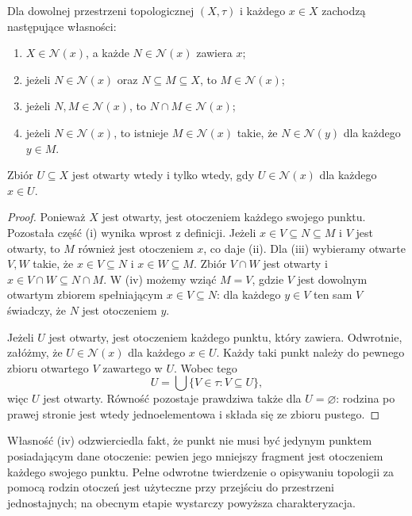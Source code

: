 \begin{stwierdzenie}
\label{prop:topog-otoczenia}
Dla dowolnej przestrzeni topologicznej $(X,\tau)$
i każdego $x\in X$ zachodzą następujące własności:
\begin{enumerate}[label=(\roman*)]
\item $X\in\mathcal N(x)$, a każde $N\in\mathcal N(x)$ zawiera $x$;
\item jeżeli $N\in\mathcal N(x)$ oraz $N\subseteq M\subseteq X$,
      to $M\in\mathcal N(x)$;
\item jeżeli $N,M\in\mathcal N(x)$, to
      $N\cap M\in\mathcal N(x)$;
\item jeżeli $N\in\mathcal N(x)$, to istnieje $M\in\mathcal N(x)$
      takie, że $N\in\mathcal N(y)$ dla każdego $y\in M$.
\end{enumerate}
Zbiór $U\subseteq X$ jest otwarty wtedy i tylko wtedy, gdy
$U\in\mathcal N(x)$ dla każdego $x\in U$.
\end{stwierdzenie}
\begin{proof}
Ponieważ $X$ jest otwarty, jest otoczeniem każdego swojego punktu.
Pozostała część (i) wynika wprost z definicji.
Jeżeli $x\in V\subseteq N\subseteq M$ i $V$ jest otwarty,
to $M$ również jest otoczeniem $x$, co daje (ii).
Dla (iii) wybieramy otwarte $V,W$ takie, że
$x\in V\subseteq N$ i $x\in W\subseteq M$.
Zbiór $V\cap W$ jest otwarty i
$x\in V\cap W\subseteq N\cap M$.
W (iv) możemy wziąć $M=V$, gdzie $V$ jest dowolnym
otwartym zbiorem spełniającym $x\in V\subseteq N$:
dla każdego $y\in V$ ten sam $V$ świadczy,
że $N$ jest otoczeniem $y$.

Jeżeli $U$ jest otwarty, jest otoczeniem każdego punktu,
który zawiera. Odwrotnie, załóżmy, że $U\in\mathcal N(x)$
dla każdego $x\in U$. Każdy taki punkt należy do pewnego
zbioru otwartego $V$ zawartego w $U$. Wobec tego
\[
U=\bigcup\{V\in\tau:V\subseteq U\},
\]
więc $U$ jest otwarty. Równość pozostaje prawdziwa także dla
$U=\varnothing$: rodzina po prawej stronie jest wtedy
jednoelementowa i składa się ze zbioru pustego.
\end{proof}

\begin{uwaga}
\label{rem:topog-otoczenia-topologia}
Własność (iv) odzwierciedla fakt, że punkt nie musi być
jedynym punktem posiadającym dane otoczenie: pewien
jego mniejszy fragment jest otoczeniem każdego swojego punktu.
Pełne odwrotne twierdzenie o opisywaniu topologii za pomocą
rodzin otoczeń jest użyteczne przy przejściu do przestrzeni
jednostajnych; na obecnym etapie wystarczy powyższa charakteryzacja.
\end{uwaga}

